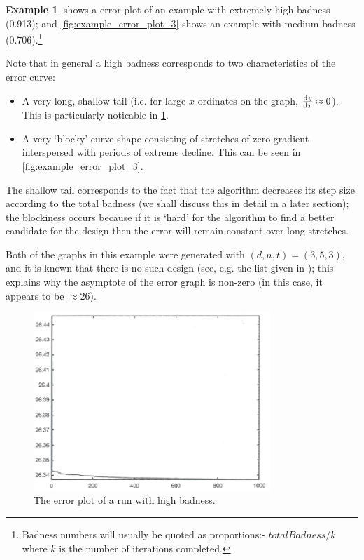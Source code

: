 \documentclass{article}
\theoremstyle{definition}
\newtheorem{ex}{Example}
\begin{document}
  \begin{ex}
     shows a error plot of an example with extremely high badness (0.913); and
    \cref{fig:example_error_plot_3} shows an example with medium badness (0.706).\footnote{Badness numbers will
    usually be quoted as proportions:- $ totalBadness/k $ where $ k $ is the number of iterations completed.}

    Note that in general a high badness corresponds to two characteristics of the error curve:
    \begin{itemize}
      \item A very long, shallow tail (i.e. for large $ x$-ordinates on the graph, $ \od{y}{x} \approx 0 $). This
            is particularly noticable in \cref{fig:example_error_plot_2}.
      \item A very `blocky' curve shape consisting of stretches of zero gradient interspersed with periods of
            extreme decline. This can be seen in \cref{fig:example_error_plot_3}.
    \end{itemize}
    The shallow tail corresponds to the fact that the algorithm decreases its step size according to the total
    badness (we shall discuss this in detail in a later section); the blockiness occurs because if it is `hard'
    for the algorithm to find a better candidate for the design then the error will remain constant over long
    stretches.

    Both of the graphs in this example were generated with $ (d,n,t) = (3,5,3) $, and it
    is known that there is no such design (see, e.g. the list given in \autocite[\S 6.16]{waldron2018});
    this explains why the asymptote of the error graph is non-zero (in this case, it
    appears to be $ \approx 26 $).
  \end{ex}

  \begin{figure}
    \centering
    \includegraphics[width=0.8\textwidth]{example_error_plot_2}
    \caption{The error plot of a run with high badness.\label{fig:example_error_plot_2}}
  \end{figure}
\end{document}
